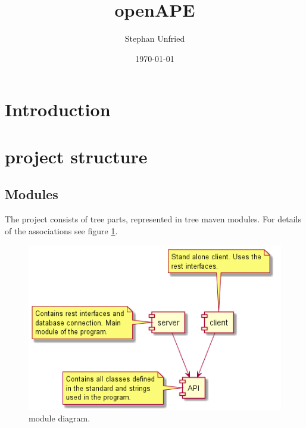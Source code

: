 \documentclass[10pt]{article}
\title{openAPE}
\author{Stephan Unfried}
\date{\today}
\begin{document}
\maketitle
\newpage
\tableofcontents
\newpage
\section{Introduction}
\section{project structure}
\subsection{Modules}
The project consists of tree parts, represented in tree maven modules. For details of the associations see figure \ref{fig:moduleuml}.
\begin{figure}[b]
\centering
\includegraphics[width=1\textwidth]{uml/modulesuml.png}
\caption{module diagram.}
\label{fig:moduleuml}
\end{figure}
\end{document}
